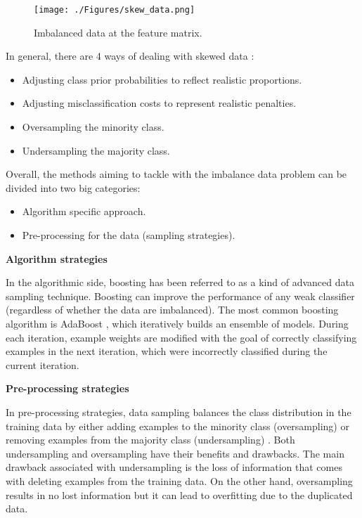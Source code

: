 \begin{figure}[ht]
	\centering
		\texttt{[image: ./Figures/skew\_data.png]}
	\caption[Imbalanced Data]{Imbalanced data at the feature matrix.}
	\label{fig:skw_dat}
\end{figure}


In general, there are 4 ways of dealing with skewed data \citep{Qi2004}:
\begin{itemize}
	\item Adjusting class prior probabilities to reflect realistic proportions.
	\item Adjusting misclassification costs to represent realistic penalties.
	\item Oversampling the minority class.
	\item Undersampling the majority class.
\end{itemize}

Overall, the methods aiming to tackle with the imbalance data problem can be divided into two big categories:
\begin{itemize}
	\item Algorithm specific approach.
	\item Pre-processing for the data (sampling strategies).
\end{itemize}

\textbf{Algorithm strategies}

In the algorithmic side, boosting has been referred to as a kind of advanced data sampling technique. Boosting can improve the performance of any weak classifier (regardless of whether the data are imbalanced). The most common boosting algorithm is AdaBoost \citep{Freund1996}, which iteratively builds an ensemble of models. During each iteration, example weights are modified with the goal of correctly classifying examples in the next iteration, which were incorrectly classified during the current iteration.

\textbf{Pre-processing strategies}

In pre-processing strategies, data sampling balances the class distribution in the training data by either adding examples to the minority class (oversampling) \citep{Chawla2002} or removing examples from the majority class (undersampling) \citep{Seiffert2010}. Both undersampling and oversampling have their benefits and drawbacks. The main drawback associated with undersampling is the loss of information that comes with deleting examples from the training data. On the other hand, oversampling results in no lost information but it can lead to overfitting due to the duplicated data.

